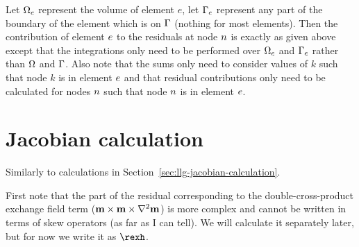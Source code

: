 Let $\Omega_e$ represent the volume of element $e$, let ${\Gamma}_e$ represent any part of the boundary of the element which is on ${\Gamma}$ (nothing for most elements). Then the contribution of element $e$ to the residuals at node $n$ is exactly as given above except that the integrations only need to be performed over $\Omega_e$ and ${\Gamma}_e$ rather than $\Omega$ and ${\Gamma}$. Also note that the sums only need to consider values of $k$ such that node $k$ is in element $e$ and that residual contributions only need to be calculated for nodes $n$ such that node $n$ is in element $e$.




\section{Jacobian calculation}
\label{sec:ll-jacobian-calculation}

Similarly to calculations in Section~\ref{sec:llg-jacobian-calculation}.

First note that the part of the residual corresponding to the double-cross-product exchange field term ($\mathbf{m} \times \mathbf{m} \times \nabla^2 \mathbf{m}$) is more complex and cannot be written in terms of skew operators (as far as I can tell).
We will calculate it separately later, but for now we write it as $\rexh$.

